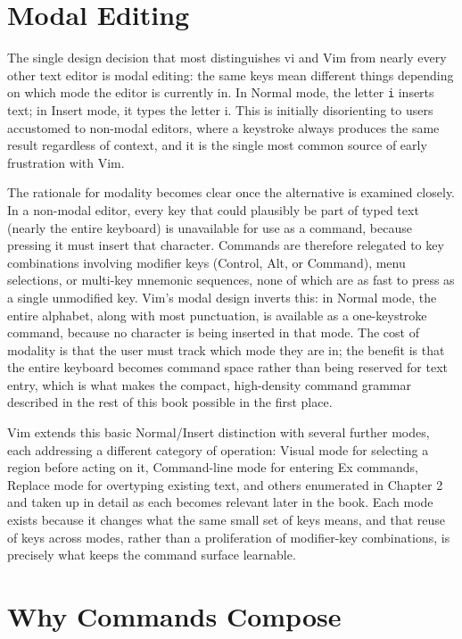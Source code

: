 \section{Modal Editing}

The single design decision that most distinguishes vi and Vim from nearly every other text editor is modal editing: the same keys mean different things depending on which mode the editor is currently in. In Normal mode, the letter \texttt{i} inserts text; in Insert mode, it types the letter i. This is initially disorienting to users accustomed to non-modal editors, where a keystroke always produces the same result regardless of context, and it is the single most common source of early frustration with Vim.

The rationale for modality becomes clear once the alternative is examined closely. In a non-modal editor, every key that could plausibly be part of typed text (nearly the entire keyboard) is unavailable for use as a command, because pressing it must insert that character. Commands are therefore relegated to key combinations involving modifier keys (Control, Alt, or Command), menu selections, or multi-key mnemonic sequences, none of which are as fast to press as a single unmodified key. Vim's modal design inverts this: in Normal mode, the entire alphabet, along with most punctuation, is available as a one-keystroke command, because no character is being inserted in that mode. The cost of modality is that the user must track which mode they are in; the benefit is that the entire keyboard becomes command space rather than being reserved for text entry, which is what makes the compact, high-density command grammar described in the rest of this book possible in the first place.

Vim extends this basic Normal/Insert distinction with several further modes, each addressing a different category of operation: Visual mode for selecting a region before acting on it, Command-line mode for entering Ex commands, Replace mode for overtyping existing text, and others enumerated in Chapter 2 and taken up in detail as each becomes relevant later in the book. Each mode exists because it changes what the same small set of keys means, and that reuse of keys across modes, rather than a proliferation of modifier-key combinations, is precisely what keeps the command surface learnable.

\section{Why Commands Compose}

